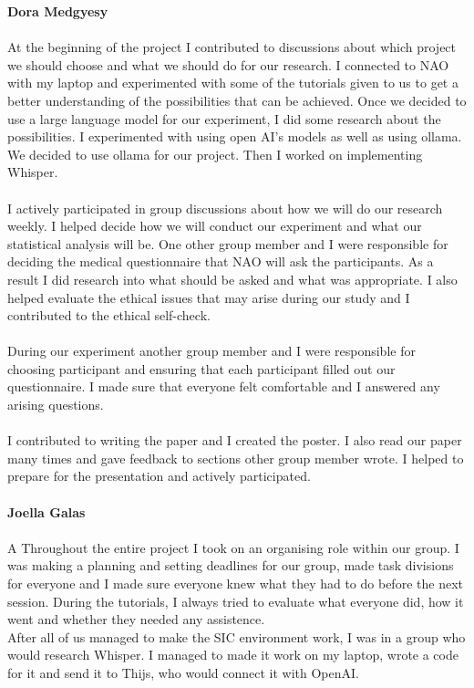 \documentclass[runningheads]{llncs}
\begin{document}
\textbf{Dora Medgyesy}
\\\\
At the beginning of the project I contributed to discussions about which project we should choose and what we should do for our research. I connected to NAO with my laptop and experimented with some of the tutorials given to us to get a better understanding of the possibilities that can be achieved. Once we decided to use a large language model for our experiment, I did some research about the possibilities. I experimented with using open AI's models as well as using ollama. We decided to use ollama for our project. Then I worked on implementing Whisper. 
\\\\
I actively participated in group discussions about how we will do our research weekly. I helped decide how we will conduct our experiment and what our statistical analysis will be. One other group member and I were responsible for deciding the medical questionnaire that NAO will ask the participants. As a result I did research into what should be asked and what was appropriate. I also helped evaluate the ethical issues that may arise during our study and I contributed to the ethical self-check. 
\\\\
During our experiment another group member and I were responsible for choosing participant and ensuring that each participant filled out our questionnaire. I made sure that everyone felt comfortable and I answered any arising questions. 
\\\\
I contributed to writing the paper and I created the poster. I also read our paper many times and gave feedback to sections other group member wrote. I helped to prepare for the presentation and actively participated. 
\\\\
\textbf{Joella Galas}
\\\\
A Throughout the entire project I took on an organising role within our group. I was making a planning and setting deadlines for our group, made task divisions for everyone and I made sure everyone knew what they had to do before the next session. During the tutorials, I always tried to evaluate what everyone did, how it went and whether they needed any assistence. \\

After all of us managed to make the SIC environment work, I was in a group who would research Whisper. I managed to made it work on my laptop, wrote a code for it and send it to Thijs, who would connect it with OpenAI. \\
\end{document}
